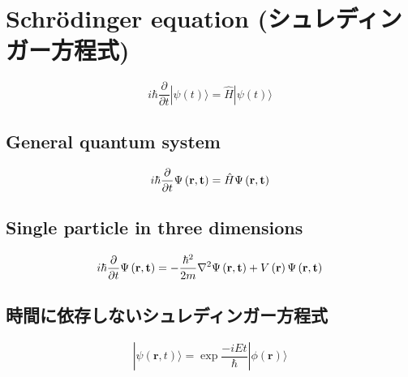 \section{Schr\"odinger equation (シュレディンガー方程式)}

\begin{equation}
  i \hbar \frac{ \partial{} }{ \partial{}t } | \psi(t) \rangle = \hat{H} | \psi(t) \rangle
\end{equation}


\subsection{General quantum system}
\begin{equation}
  i\hbar \frac{ \partial }{ \partial t } \Psi \left( \bf{r} , t \right) = \hat{H} \Psi \left( \bf{r} , t \right)
\end{equation}


\subsection{Single particle in three dimensions}
\begin{equation}
  i\hbar \frac{ \partial }{ \partial t } \Psi \left( \bf{r} , t \right)
    = -\frac{{\hbar}^2}{2m} {\nabla}^2 \Psi \left( \bf{r} , t \right) + V \left( \bf{r} \right) \Psi \left( \bf{r} , t \right)
\end{equation}


\subsection{時間に依存しないシュレディンガー方程式}
\begin{equation}
  | \psi ( \mathbf{r} , t ) \rangle = \exp{ \frac{-iEt}{ \hbar }  } | \phi ( \mathbf{r} ) \rangle
\end{equation}
